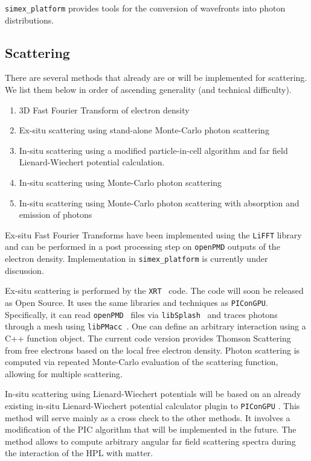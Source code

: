 \documentclass[a4paper]{article}
\begin{document}
\texttt{simex\_platform} provides tools for the conversion of wavefronts into photon distributions.
\subsection{Scattering}

There are several methods that already are or will be implemented for scattering. We list them below in order of ascending generality (and technical difficulty).

\begin{enumerate}
\item 3D Fast Fourier Transform of electron density \label{pmi:methods:fft}
\item Ex-situ scattering using stand-alone Monte-Carlo photon scattering \label{pmi:methods:exsituphoton}
\item In-situ scattering using a modified particle-in-cell algorithm and far field Lienard-Wiechert potential calculation.\label{pmi:methods:insitulienardwiechert}
\item In-situ scattering using Monte-Carlo photon scattering\label{pmi:methods:insituphoton}
\item In-situ scattering using Monte-Carlo photon scattering with absorption and emission of photons\label{pmi:methods:insituphotoninteract}
\end{enumerate}

Ex-situ Fast Fourier Transforms have been implemented using the \texttt{LiFFT} library \cite{liblifft_github} and can be performed in a post processing step on \texttt{openPMD} outputs of the electron density. Implementation in \texttt{simex\_platform} is currently under discussion.

Ex-situ scattering is performed by the \texttt{XRT}~\cite{xrt_github} code. The code will soon be released as Open Source. It uses the same libraries and techniques as \texttt{PIConGPU}. Specifically, it can read \texttt{openPMD}~\cite{openPMD} files via \texttt{libSplash}~\cite{libSplash_github} and traces photons through a mesh using \texttt{libPMacc}~\cite{picongpu_github}. One can define an arbitrary interaction using a C++ function object. The current code version provides Thomson Scattering from free electrons based on the local free electron density. Photon scattering is computed via repeated Monte-Carlo evaluation of the scattering function, allowing for multiple scattering.

In-situ scattering using Lienard-Wiechert potentials will be based on an already existing in-situ Lienard-Wiechert potential calculator plugin to \texttt{PIConGPU} \cite{Pausch2013}. This method will serve mainly as a cross check to the other methods. It involves a modification of the PIC algorithm that will be implemented in the future. The method allows to compute arbitrary angular far field scattering spectra during the interaction of the HPL with matter.
\end{document}
